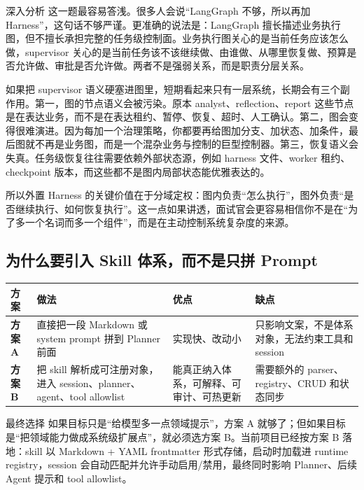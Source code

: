 \documentclass[12pt]{article}
\begin{document}
\begin{analysisBox}{深入分析}
这一题最容易答浅。很多人会说“LangGraph 不够，所以再加 Harness”，这句话不够严谨。更准确的说法是：LangGraph 擅长描述业务执行图，但不擅长承担完整的任务级控制面。业务执行图关心的是当前任务应该怎么做，supervisor 关心的是当前任务该不该继续做、由谁做、从哪里恢复做、预算是否允许做、审批是否允许做。两者不是强弱关系，而是职责分层关系。

如果把 supervisor 语义硬塞进图里，短期看起来只有一层系统，长期会有三个副作用。第一，图的节点语义会被污染。原本 analyst、reflection、report 这些节点是在表达业务，而不是在表达租约、暂停、恢复、超时、人工确认。第二，图会变得很难演进。因为每加一个治理策略，你都要再给图加分支、加状态、加条件，最后图就不再是业务图，而是一个混杂业务与控制的巨型控制器。第三，恢复语义会失真。任务级恢复往往需要依赖外部状态源，例如 harness 文件、worker 租约、checkpoint 版本，而这些都不是图内局部状态能优雅表达的。

所以外置 Harness 的关键价值在于分域定权：图内负责“怎么执行”，图外负责“是否继续执行、如何恢复执行”。这一点如果讲透，面试官会更容易相信你不是在“为了多一个名词而多一个组件”，而是在主动控制系统复杂度的来源。
\end{analysisBox}

\subsection{为什么要引入 Skill 体系，而不是只拼 Prompt}
\begin{center}
\small
\begin{tabularx}{\textwidth}{>{\bfseries}lXXX}
\toprule
方案 & 做法 & 优点 & 缺点 \\
\midrule
方案 A & 直接把一段 Markdown 或 system prompt 拼到 Planner 前面 & 实现快、改动小 & 只影响文案，不是体系对象，无法约束工具和 session \\
方案 B & 把 skill 解析成可注册对象，进入 session、planner、agent、tool allowlist & 能真正纳入体系，可解释、可审计、可热更新 & 需要额外的 parser、registry、CRUD 和状态同步 \\
\bottomrule
\end{tabularx}
\end{center}

\begin{qaBox}{最终选择}
如果目标只是“给模型多一点领域提示”，方案 A 就够了；但如果目标是“把领域能力做成系统级扩展点”，就必须选方案 B。当前项目已经按方案 B 落地：skill 以 Markdown + YAML frontmatter 形式存储，启动时加载进 runtime registry，session 会自动匹配并允许手动启用/禁用，最终同时影响 Planner、后续 Agent 提示和 tool allowlist。
\end{qaBox}
\end{document}
